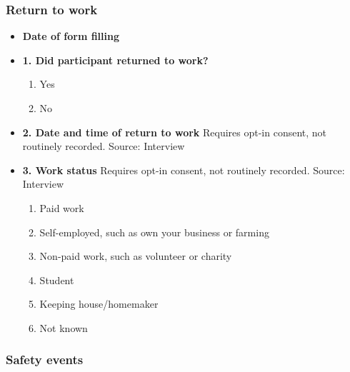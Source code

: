 \documentclass[
]{scrartcl}
\providecommand{\tightlist}{%
  \setlength{\itemsep}{0pt}\setlength{\parskip}{0pt}}\usepackage{longtable,booktabs,array}
\begin{document}
\hypertarget{return-to-work}{%
\subsubsection{Return to work}\label{return-to-work}}

\begin{itemize}
\item
  \textbf{Date of form filling}
\item
  \textbf{1. Did participant returned to work?}

  \begin{enumerate}
  \def\labelenumi{\arabic{enumi}.}
  \tightlist
  \item
    Yes
  \item
    No
  \end{enumerate}
\item
  \textbf{2. Date and time of return to work} Requires opt-in consent,
  not routinely recorded. Source: Interview
\item
  \textbf{3. Work status} Requires opt-in consent, not routinely
  recorded. Source: Interview

  \begin{enumerate}
  \def\labelenumi{\arabic{enumi}.}
  \tightlist
  \item
    Paid work
  \item
    Self-employed, such as own your business or farming
  \item
    Non-paid work, such as volunteer or charity
  \item
    Student
  \item
    Keeping house/homemaker
  \item
    Not known
  \end{enumerate}
\end{itemize}

\hypertarget{safety-events}{%
\subsubsection{Safety events}\label{safety-events}}
\end{document}
